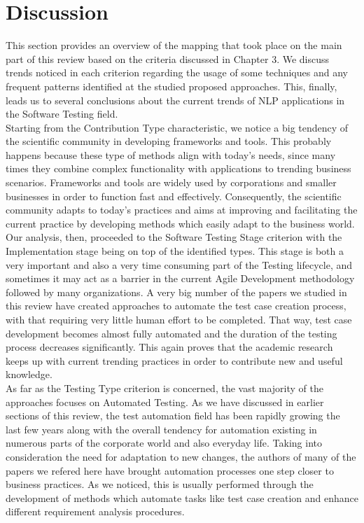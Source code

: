 \chapter{Discussion}

This section provides an overview of the mapping that took place on the main part of this review based on the criteria discussed in Chapter 3. We discuss trends noticed 
in each criterion regarding the usage of some techniques and any frequent patterns identified at the studied proposed approaches. This, finally, leads us to several conclusions 
about the current trends of NLP applications in the Software Testing field.\\

Starting from the Contribution Type characteristic, we notice a big tendency of the scientific community in developing frameworks and tools. This probably happens because 
these type of methods align with today's needs, since many times they combine complex functionality with applications to trending business scenarios. Frameworks and tools are 
widely used by corporations and smaller businesses in order to function fast and effectively. Consequently, the scientific community adapts to today's practices and aims at 
improving and facilitating the current practice by developing methods which easily adapt to the business world.\\

Our analysis, then, proceeded to the Software Testing Stage criterion with the Implementation stage being on top of the identified types. This stage is both a very important and 
also a very time consuming part of the Testing lifecycle, and sometimes it may act as a barrier in the current Agile Development methodology followed by many organizations. A very 
big number of the papers we studied in this review have created approaches to automate the test case creation process, with that requiring very little human effort to be completed. 
That way, test case development becomes almost fully automated and the duration of the testing process decreases significantly. This again proves that the academic research keeps 
up with current trending practices in order to contribute new and useful knowledge.\\

As far as the Testing Type criterion is concerned, the vast majority of the approaches focuses on Automated Testing. As we have discussed in earlier sections of this review, the test automation 
field has been rapidly growing the last few years along with the overall tendency for automation existing in numerous parts of the corporate world and also everyday life. Taking into consideration 
the need for adaptation to new changes, the authors of many of the papers we refered here have brought automation processes one step closer to business practices. As we noticed, this is usually performed through 
the development of methods which automate tasks like test case creation and enhance different requirement analysis procedures.\\

